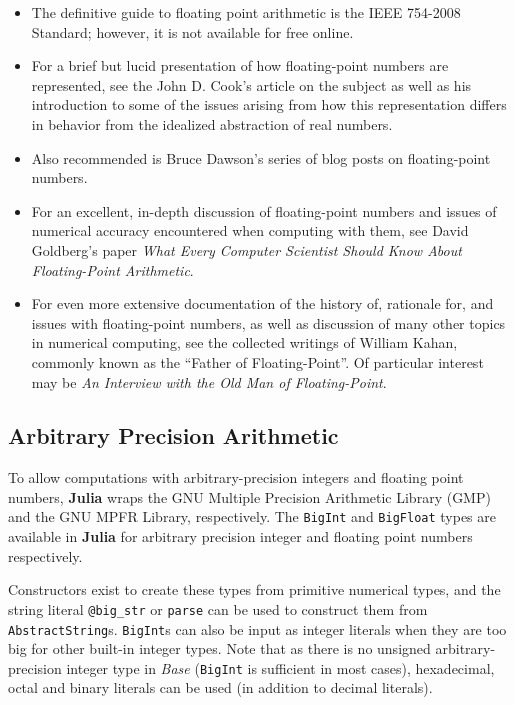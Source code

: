 \documentclass[
]{article}
\providecommand{\tightlist}{%
  \setlength{\itemsep}{0pt}\setlength{\parskip}{0pt}}
\begin{document}
\begin{itemize}
\tightlist
\item
  The definitive guide to floating point arithmetic is the IEEE 754-2008
  Standard; however, it is not available for free online.
\item
  For a brief but lucid presentation of how floating-point numbers are
  represented, see the John D. Cook's article on the subject as well as
  his introduction to some of the issues arising from how this
  representation differs in behavior from the idealized abstraction of
  real numbers.
\item
  Also recommended is Bruce Dawson's series of blog posts on
  floating-point numbers.
\item
  For an excellent, in-depth discussion of floating-point numbers and
  issues of numerical accuracy encountered when computing with them, see
  David Goldberg's paper \emph{What Every Computer Scientist Should Know
  About Floating-Point Arithmetic}.
\item
  For even more extensive documentation of the history of, rationale
  for, and issues with floating-point numbers, as well as discussion of
  many other topics in numerical computing, see the collected writings
  of William Kahan, commonly known as the ``Father of Floating-Point''.
  Of particular interest may be \emph{An Interview with the Old Man of
  Floating-Point}.
\end{itemize}

\hypertarget{arbitrary-precision-arithmetic}{%
\subsection{Arbitrary Precision
Arithmetic}\label{arbitrary-precision-arithmetic}}

To allow computations with arbitrary-precision integers and floating
point numbers, \textbf{Julia} wraps the GNU Multiple Precision
Arithmetic Library (GMP) and the GNU MPFR Library, respectively. The
\texttt{BigInt} and \texttt{BigFloat} types are available in
\textbf{Julia} for arbitrary precision integer and floating point
numbers respectively.

Constructors exist to create these types from primitive numerical types,
and the string literal \texttt{@big\_str} or \texttt{parse} can be used
to construct them from \texttt{AbstractString}s. \texttt{BigInt}s can
also be input as integer literals when they are too big for other
built-in integer types. Note that as there is no unsigned
arbitrary-precision integer type in \emph{Base} (\texttt{BigInt} is
sufficient in most cases), hexadecimal, octal and binary literals can be
used (in addition to decimal literals).
\end{document}
